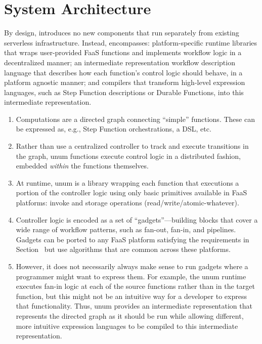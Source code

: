 \section{System Architecture}\label{sec:architecture}

By design, \name{} introduces no new components that run separately from
existing serverless infrastructure. Instead, \name{} encompasses:
platform-specific runtime libraries that wraps user-provided FaaS functions and
implements workflow logic in a decentralized manner; an intermediate
representation workflow description language that describes how each function's
control logic should behave, in a platform agnostic manner; and compilers that
transform high-level expression languages, such as Step Function descriptions or
Durable Functions, into this intermediate representation.

\begin{enumerate}
  \item Computations are a directed graph connecting ``simple'' functions. These
        can be expressed as, e.g., Step Function orchestrations, a DSL, etc.
  \item Rather than use a centralized controller to track and execute
        transitions in the graph, unum functions execute control logic in a distributed
        fashion, embedded \emph{within} the functions themselves.
  \item At runtime, unum is a library wrapping each function that executions a
        portion of the controller logic using only basic primitives available in FaaS
        platforms: invoke and storage operations (read/write/atomic-whatever).
  \item Controller logic is encoded as a set of ``gadgets''---building blocks
        that cover a wide range of workflow patterns, such as fan-out, fan-in,
        and pipelines. Gadgets can be ported to any FaaS platform satisfying the
        requirements in Section~\label{sec:motivation} but use algorithms that
        are common across these platforms.
  \item However, it does not necessarily always make sense to run gadgets where
        a programmer might want to express them. For example, the unum runtime executes
        fan-in logic at each of the source functions rather than in the target function,
        but this might not be an intuitive way for a developer to express that
        functionality. Thus, unum provides an intermediate representation that
        represents the directed graph as it should be run while allowing different, more
        intuitive expression languages to be compiled to this intermediate
        representation.
\end{enumerate}

